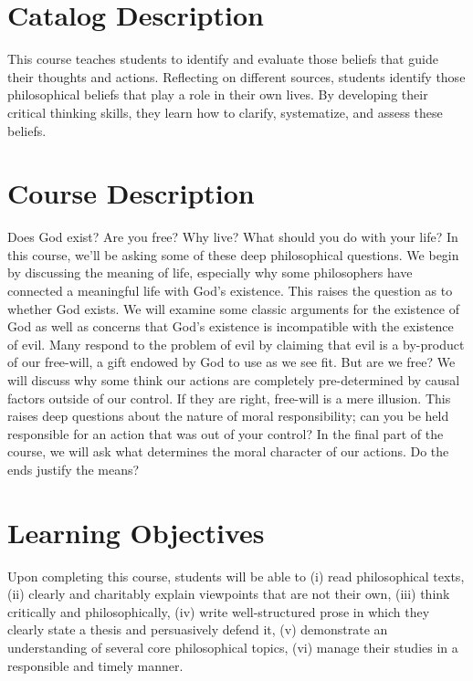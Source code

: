 \documentclass[article,oneside]{memoir}
\begin{document}
\section{Catalog Description}

This course teaches students to identify and evaluate those beliefs that guide their thoughts and actions. Reflecting on different sources, students identify those philosophical beliefs that play a role in their own lives. By developing their critical thinking skills, they learn how to clarify, systematize, and assess these beliefs. 

\section{Course Description}

Does God exist? Are you free? Why live? What should you do with your life?  In this course, we'll be asking some of these deep philosophical questions. We begin by discussing the meaning of life, especially why some philosophers have connected a meaningful life with God's existence. This raises the question as to whether God exists. We will examine some classic arguments for the existence of God as well as concerns that God's existence is incompatible with the existence of evil. Many respond to the problem of evil by claiming that evil is a by-product of our free-will, a gift endowed by God to use as we see fit. But are we free? We will discuss why some think our actions are completely pre-determined by causal factors outside of our control. If they are right, free-will is a mere illusion. This raises deep questions about the nature of moral responsibility; can you be held responsible for an action that was out of your control? In the final part of the course, we will ask what determines the moral character of our actions. Do the ends justify the means? %

\section{Learning Objectives}

Upon completing this course, students will be able to (i) read
philosophical texts, (ii) clearly and charitably explain viewpoints that
are not their own, (iii) think critically and philosophically, (iv)
write well-structured prose in which they clearly state a thesis and
persuasively defend it, (v) demonstrate an understanding of several core
philosophical topics, (vi) manage their studies in a responsible and timely manner. 
\end{document}
